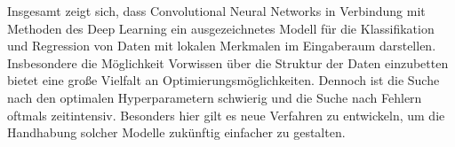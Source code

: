 Insgesamt zeigt sich, dass Convolutional Neural Networks in Verbindung mit Methoden des Deep Learning ein ausgezeichnetes Modell für die Klassifikation und Regression von Daten mit lokalen Merkmalen im Eingaberaum darstellen. Insbesondere die Möglichkeit Vorwissen über die Struktur der Daten einzubetten bietet eine große Vielfalt an Optimierungsmöglichkeiten. Dennoch ist die Suche nach den optimalen Hyperparametern schwierig und die Suche nach Fehlern oftmals zeitintensiv. Besonders hier gilt es neue Verfahren zu entwickeln, um die Handhabung solcher Modelle zukünftig einfacher zu gestalten.

